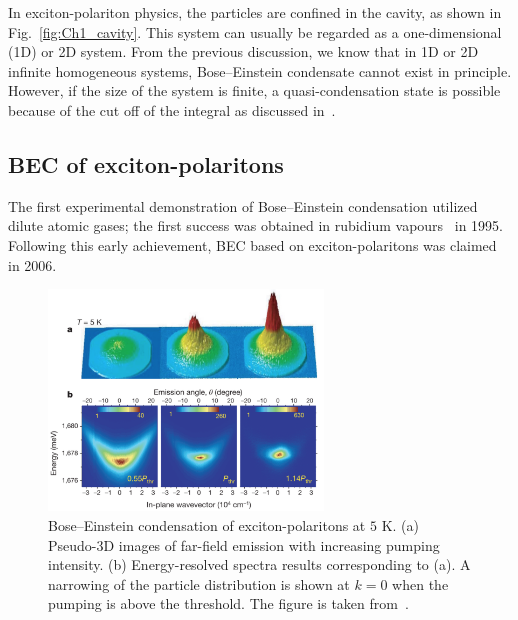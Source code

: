 In exciton-polariton physics, the particles are confined in the cavity, as shown in Fig.~\ref{fig:Ch1_cavity}.
This system can usually be regarded as a one-dimensional (1D) or 2D system.
From the previous discussion, we know that in 1D or 2D infinite homogeneous systems, Bose--Einstein condensate cannot exist in principle.
However, if the size of the system is finite, a quasi-condensation state is possible because of the cut off of the integral as discussed in~\cite{Bagnato:1991aa,Hohenberg:1967aa,PhysRevLett.17.1133}.

\subsection{BEC of exciton-polaritons}
The first experimental demonstration of Bose--Einstein condensation utilized dilute atomic gases; the first success was obtained in rubidium vapours~\cite{Anderson:1995aa} in 1995.
Following this early achievement, BEC based on exciton-polaritons was claimed~\cite{Kasprzak:2006aa} in 2006.
%
\begin{figure}[ht]
    \centering
    \includegraphics[width=0.65\textwidth]{Fig/Ch1/exp_BEC.png}
    \caption[Polaritons in BEC]{Bose--Einstein condensation of exciton-polaritons at $5$ K. (a) Pseudo-3D images of far-field emission with increasing pumping intensity. (b) Energy-resolved spectra results corresponding to (a). A narrowing of the particle distribution is shown at $k=0$ when the pumping is above the threshold. The figure is taken from~\cite{Kasprzak:2006aa}.}
    \label{fig:Ch1_exciton-polariton_BEC}
\end{figure}
%

